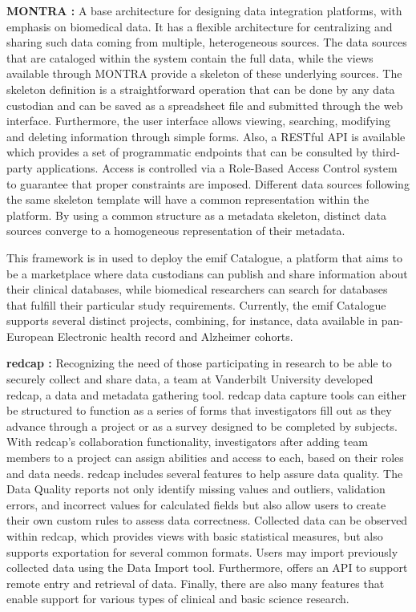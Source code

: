 \textbf{MONTRA \cite{montra}:}
A base architecture for designing data integration platforms, with emphasis on
biomedical data.
It has a flexible architecture for centralizing and sharing such data coming from
multiple, heterogeneous sources.
The data sources that are cataloged within the system contain the full data, while the
views available through MONTRA provide a skeleton of these underlying sources.
The skeleton definition is a straightforward operation that can be done by any data
custodian and can be saved as a spreadsheet file and submitted through the web
interface.
Furthermore, the user interface allows viewing, searching, modifying and deleting
information through simple forms.
Also, a RESTful API is available which provides a set of programmatic endpoints that
can be consulted by third-party applications.
Access is controlled via a Role-Based Access Control system to guarantee that proper
constraints are imposed.
Different data sources following the same skeleton template will have a common
representation within the platform.
By using a common structure as a metadata skeleton, distinct data sources converge to a
homogeneous representation of their metadata.

This framework is in used to deploy the \gls{emif} Catalogue, a platform that aims to
be a marketplace where data custodians can publish and share information about their
clinical databases, while biomedical researchers can search for databases that fulfill
their particular study requirements.
Currently, the \gls{emif} Catalogue supports several distinct projects, combining, for
instance, data available in pan-European Electronic health record and Alzheimer
cohorts.

\textbf{\gls{redcap} \cite{redcap}:}
Recognizing the need of those participating in research to be able to securely collect
and share data, a team at Vanderbilt University developed \gls{redcap}, a data and
metadata gathering tool.
\gls{redcap} data capture tools can either be structured to function as a series of
forms that investigators fill out as they advance through a project or as a survey
designed to be completed by subjects.
With \gls{redcap}'s collaboration functionality, investigators after adding team
members to a project can assign abilities and access to each, based on their roles and
data needs.
\gls{redcap} includes several features to help assure data quality.
The Data Quality reports not only identify missing values and outliers, validation
errors, and incorrect values for calculated fields but also allow users to create their
own custom rules to assess data correctness.
Collected data can be observed within \gls{redcap}, which provides views with basic
statistical measures, but also supports exportation for several common formats.
Users may import previously collected data using the Data Import tool.
Furthermore, offers an API to support remote entry and retrieval of data.
Finally, there are also many features that enable support for various types of clinical and
basic science research.

